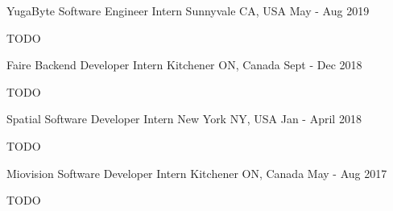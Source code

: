 
\begin{cventries}
\cventry
    {YugaByte}
    {Software Engineer Intern}
    {Sunnyvale CA, USA}
    {May - Aug 2019}
    {
      \begin{cvitems}
      	\item TODO
      \end{cvitems}
    }

\cventry
    {Faire}
    {Backend Developer Intern}
    {Kitchener ON, Canada}
    {Sept - Dec 2018}
    {
      \begin{cvitems}
      	\item TODO
      \end{cvitems}
    }
    
\cventry
    {Spatial}
    {Software Developer Intern}
    {New York NY, USA}
    {Jan - April 2018}
    {
      \begin{cvitems}
      	\item TODO
      \end{cvitems}
    }
    
\cventry
    {Miovision}
    {Software Developer Intern}
    {Kitchener ON, Canada}
    {May - Aug 2017}
    {
      \begin{cvitems}
      	\item TODO
      \end{cvitems}
    }

\end{cventries}